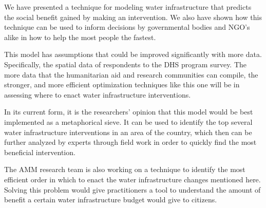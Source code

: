 We have presented a technique for modeling water infrastructure that predicts the social benefit gained by making an intervention. We also have shown how this technique can be used to inform decisions by governmental bodies and NGO's alike in how to help the most people the fastest.

This model has assumptions that could be improved significantly with more data.
Specifically, the spatial data of respondents to the DHS program survey.
The more data that the humanitarian aid and research communities can compile, the stronger, and more efficient optimization techniques like this one will be in assessing where to enact water infrastructure interventions.

In its current form, it is the researchers' opinion that this model would be best implemented as a metaphorical sieve.
It can be used to identify the top several water infrastructure interventions in an area of the country, which then can be further analyzed by experts through field work in order to quickly find the most beneficial intervention.

The AMM research team is also working on a technique to identify the most efficient order in which to enact the water infrastructure changes mentioned here.
Solving this problem would give practitioners a tool to understand the amount of benefit a certain water infrastructure budget would give to citizens.
